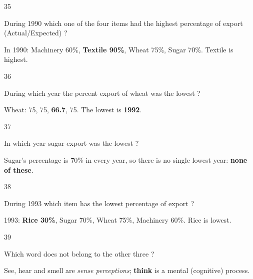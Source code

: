 \begin{question}{35}
{During 1990 which one of the four items had the highest percentage of export (Actual/Expected) ?\par}
\begin{explain}
In 1990: Machinery 60\%, \textbf{Textile 90\%}, Wheat 75\%, Sugar 70\%. Textile is highest.
\end{explain}
\end{question}

\begin{question}{36}
{During which year the percent export of wheat was the lowest ?\par}
\begin{explain}
Wheat: 75, 75, \textbf{66.7}, 75. The lowest is \textbf{1992}.
\end{explain}
\end{question}

\begin{question}{37}
{In which year sugar export was the lowest ?\par}
\begin{explain}
Sugar's percentage is 70\% in every year, so there is no single lowest year: \textbf{none of these}.
\end{explain}
\end{question}

\begin{question}{38}
{During 1993 which item has the lowest percentage of export ?\par}
\begin{explain}
1993: \textbf{Rice 30\%}, Sugar 70\%, Wheat 75\%, Machinery 60\%. Rice is lowest.
\end{explain}
\end{question}

\begin{question}{39}
{Which word does not belong to the other three ?\par}
\begin{explain}
See, hear and smell are \emph{sense perceptions}; \textbf{think} is a mental (cognitive) process.
\end{explain}
\end{question}

